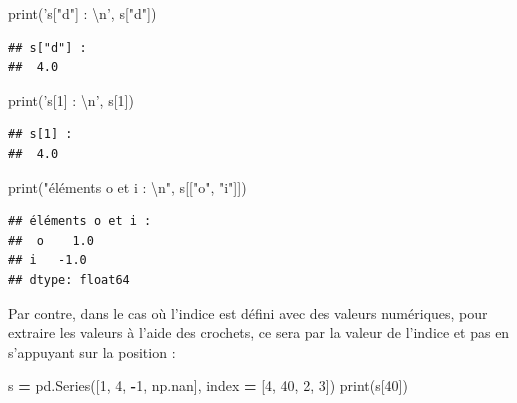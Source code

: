 \documentclass[12pt,]{book}
\newenvironment{Shaded}{\begin{snugshade}}{\end{snugshade}}
\newcommand{\DecValTok}[1]{\textcolor[rgb]{0.00,0.00,0.81}{#1}}
\newcommand{\CharTok}[1]{\textcolor[rgb]{0.31,0.60,0.02}{#1}}
\newcommand{\StringTok}[1]{\textcolor[rgb]{0.31,0.60,0.02}{#1}}
\newcommand{\OperatorTok}[1]{\textcolor[rgb]{0.81,0.36,0.00}{\textbf{#1}}}
\newcommand{\BuiltInTok}[1]{#1}
\newcommand{\NormalTok}[1]{#1}
\numberwithin{equation}{section}
\numberwithin{countremarque}{section}
\begin{document}
\begin{Shaded}
\begin{Highlighting}[]
\BuiltInTok{print}\NormalTok{(}\StringTok{'s["d"] : }\CharTok{\textbackslash{}n}\StringTok{'}\NormalTok{, s[}\StringTok{"d"}\NormalTok{])}
\end{Highlighting}
\end{Shaded}

\begin{lstlisting}
## s["d"] : 
##  4.0
\end{lstlisting}

\begin{Shaded}
\begin{Highlighting}[]
\BuiltInTok{print}\NormalTok{(}\StringTok{'s[1] : }\CharTok{\textbackslash{}n}\StringTok{'}\NormalTok{, s[}\DecValTok{1}\NormalTok{])}
\end{Highlighting}
\end{Shaded}

\begin{lstlisting}
## s[1] : 
##  4.0
\end{lstlisting}

\begin{Shaded}
\begin{Highlighting}[]
\BuiltInTok{print}\NormalTok{(}\StringTok{"éléments o et i : }\CharTok{\textbackslash{}n}\StringTok{"}\NormalTok{, s[[}\StringTok{"o"}\NormalTok{, }\StringTok{"i"}\NormalTok{]])}
\end{Highlighting}
\end{Shaded}

\begin{lstlisting}
## éléments o et i : 
##  o    1.0
## i   -1.0
## dtype: float64
\end{lstlisting}

Par contre, dans le cas où l'indice est défini avec des valeurs
numériques, pour extraire les valeurs à l'aide des crochets, ce sera par
la valeur de l'indice et pas en s'appuyant sur la position :

\begin{Shaded}
\begin{Highlighting}[]
\NormalTok{s }\OperatorTok{=}\NormalTok{ pd.Series([}\DecValTok{1}\NormalTok{, }\DecValTok{4}\NormalTok{, }\OperatorTok{-}\DecValTok{1}\NormalTok{, np.nan],}
\NormalTok{             index }\OperatorTok{=}\NormalTok{ [}\DecValTok{4}\NormalTok{, }\DecValTok{40}\NormalTok{, }\DecValTok{2}\NormalTok{, }\DecValTok{3}\NormalTok{])}
\BuiltInTok{print}\NormalTok{(s[}\DecValTok{40}\NormalTok{])}
\end{Highlighting}
\end{Shaded}
\end{document}

